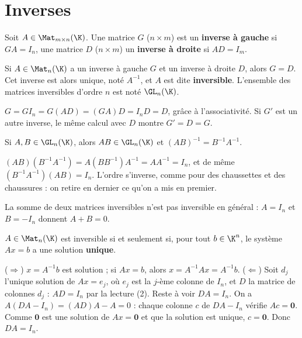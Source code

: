 \section{Inverses}
\begin{definition}
Soit $A\in\Mat_{m\times n}(\K)$. Une matrice $G$ ($n\times m$) est un \textbf{inverse à gauche} si $GA=I_n$, une matrice $D$ ($n\times m$) un \textbf{inverse à droite} si $AD=I_m$.
\end{definition}
\begin{proposition}\label{prop-inverse-unique}
Si $A\in\Mat_n(\K)$ a un inverse à gauche $G$ et un inverse à droite $D$, alors $G=D$. Cet inverse est alors unique, noté $A^{-1}$, et $A$ est dite \textbf{inversible}. L'ensemble des matrices inversibles d'ordre $n$ est noté $\GL_n(\K)$.
\end{proposition}
\begin{preuve}
$G=GI_n=G(AD)=(GA)D=I_nD=D$, grâce à l'associativité. Si $G'$ est un autre inverse, le même calcul avec $D$ montre $G'=D=G$.
\end{preuve}
\begin{proposition}\label{prop-produit-inverse}
Si $A,B\in\GL_n(\K)$, alors $AB\in\GL_n(\K)$ et $(AB)^{-1}=B^{-1}A^{-1}$.
\end{proposition}
\begin{preuve}
$(AB)(B^{-1}A^{-1})=A(BB^{-1})A^{-1}=AA^{-1}=I_n$, et de même $(B^{-1}A^{-1})(AB)=I_n$. L'ordre s'inverse, comme pour des chaussettes et des chaussures : on retire en dernier ce qu'on a mis en premier.
\end{preuve}
\begin{attention}
La somme de deux matrices inversibles n'est pas inversible en général : $A=I_n$ et $B=-I_n$ donnent $A+B=0$.
\end{attention}
\begin{theoreme}\label{thm-inv-systeme}
$A\in\Mat_n(\K)$ est inversible si et seulement si, pour tout $b\in\K^n$, le système $Ax=b$ a une solution \textbf{unique}.
\end{theoreme}
\begin{preuve}
($\Rightarrow$) $x=A^{-1}b$ est solution ; si $Ax=b$, alors $x=A^{-1}Ax=A^{-1}b$.
($\Leftarrow$) Soit $d_j$ l'unique solution de $Ax=e_j$, où $e_j$ est la $j$-ème colonne de $I_n$, et $D$ la matrice de colonnes $d_j$ : $AD=I_n$ par la lecture (2). Reste à voir $DA=I_n$. On a $A(DA-I_n)=(AD)A-A=0$ : chaque colonne $c$ de $DA-I_n$ vérifie $Ac=\mathbf 0$. Comme $\mathbf 0$ est une solution de $Ax=\mathbf 0$ et que la solution est unique, $c=\mathbf 0$. Donc $DA=I_n$.
\end{preuve}
